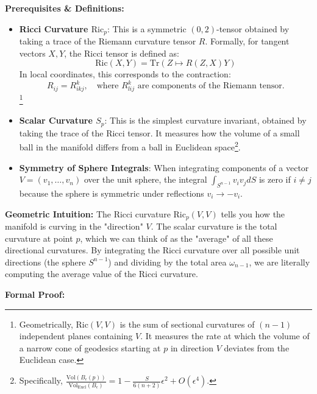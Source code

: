 \begin{solution}
\textbf{Prerequisites \& Definitions:}
\begin{itemize}
    \item \textbf{Ricci Curvature $\mathrm{Ric}_p$}: This is a symmetric $(0,2)$-tensor obtained by taking a trace of the Riemann curvature tensor $R$. Formally, for tangent vectors $X, Y$, the Ricci tensor is defined as:
    \[ \mathrm{Ric}(X, Y) = \text{Tr}(Z \mapsto R(Z, X)Y) \]
    In local coordinates, this corresponds to the contraction:
    \[ R_{ij} = R^k_{ikj}, \quad \text{where } R^k_{lij} \text{ are components of the Riemann tensor.} \]
    \footnote{Geometrically, $\mathrm{Ric}(V, V)$ is the sum of sectional curvatures of $(n-1)$ independent planes containing $V$. It measures the rate at which the volume of a narrow cone of geodesics starting at $p$ in direction $V$ deviates from the Euclidean case.}
    \item \textbf{Scalar Curvature $S_p$}: This is the simplest curvature invariant, obtained by taking the trace of the Ricci tensor. It measures how the volume of a small ball in the manifold differs from a ball in Euclidean space\footnote{Specifically, $\frac{\text{Vol}(B_{\epsilon}(p))}{\text{Vol}_{\text{Eucl}}(B_{\epsilon})} = 1 - \frac{S}{6(n+2)}\epsilon^2 + O(\epsilon^4)$.}.
    \item \textbf{Symmetry of Sphere Integrals}: When integrating components of a vector $V = (v_1, \dots, v_n)$ over the unit sphere, the integral $\int_{S^{n-1}} v_i v_j dS$ is zero if $i \neq j$ because the sphere is symmetric under reflections $v_i \to -v_i$.
\end{itemize}

\textbf{Geometric Intuition:}
The Ricci curvature $\mathrm{Ric}_p(V, V)$ tells you how the manifold is curving in the "direction" $V$. The scalar curvature is the total curvature at point $p$, which we can think of as the "average" of all these directional curvatures. By integrating the Ricci curvature over all possible unit directions (the sphere $S^{n-1}$) and dividing by the total area $\omega_{n-1}$, we are literally computing the average value of the Ricci curvature.

\textbf{Formal Proof:}


\end{solution}
